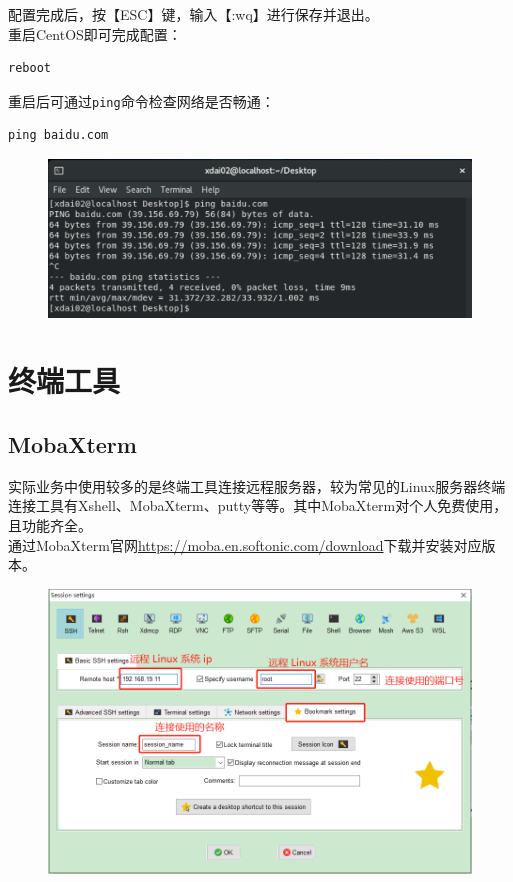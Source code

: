\documentclass[12pt, openany, oneside]{book}
\begin{document}
配置完成后，按【ESC】键，输入【:wq】进行保存并退出。 \\

重启CentOS即可完成配置：

\begin{lstlisting}
reboot
\end{lstlisting}

重启后可通过\lstinline|ping|命令检查网络是否畅通：

\vspace{-0.5cm}
\begin{lstlisting}
ping baidu.com
\end{lstlisting}

\begin{figure}[H]
    \centering
    \includegraphics[scale=0.6]{img/C1/1-4/11.png}
\end{figure}

\newpage

\section{终端工具}

\subsection{MobaXterm}

实际业务中使用较多的是终端工具连接远程服务器，较为常见的Linux服务器终端连接工具有Xshell、MobaXterm、putty等等。其中MobaXterm对个人免费使用，且功能齐全。 \\

通过MobaXterm官网\url{https://moba.en.softonic.com/download}下载并安装对应版本。 \\

\begin{figure}[H]
    \centering
    \includegraphics[scale=0.4]{img/C1/1-5/1.png}
\end{figure}
\end{document}

